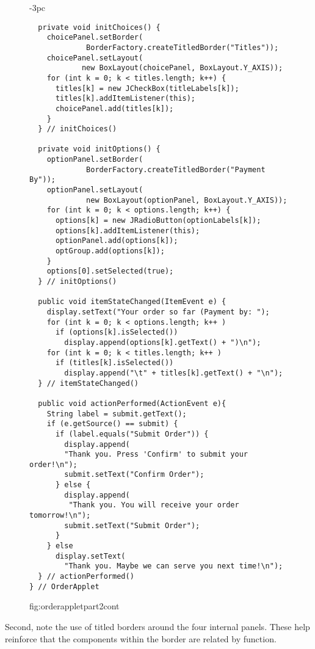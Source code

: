 \begin{figure}[p]
\addtocounter{figure}{-1}
\jjjprogstart
\begin{jjjlistingleft}[29pc]{-3pc}
\begin{lstlisting}
  private void initChoices() {
    choicePanel.setBorder(
             BorderFactory.createTitledBorder("Titles"));
    choicePanel.setLayout(
            new BoxLayout(choicePanel, BoxLayout.Y_AXIS));
    for (int k = 0; k < titles.length; k++) {
      titles[k] = new JCheckBox(titleLabels[k]);
      titles[k].addItemListener(this);
      choicePanel.add(titles[k]);
    }
  } // initChoices()

  private void initOptions() {
    optionPanel.setBorder(
             BorderFactory.createTitledBorder("Payment By"));
    optionPanel.setLayout(
             new BoxLayout(optionPanel, BoxLayout.Y_AXIS));
    for (int k = 0; k < options.length; k++) {
      options[k] = new JRadioButton(optionLabels[k]);
      options[k].addItemListener(this);
      optionPanel.add(options[k]);
      optGroup.add(options[k]);
    }
    options[0].setSelected(true);
  } // initOptions()

  public void itemStateChanged(ItemEvent e) {
    display.setText("Your order so far (Payment by: ");
    for (int k = 0; k < options.length; k++ )
      if (options[k].isSelected())
        display.append(options[k].getText() + ")\n");
    for (int k = 0; k < titles.length; k++ )
      if (titles[k].isSelected())
        display.append("\t" + titles[k].getText() + "\n");
  } // itemStateChanged()

  public void actionPerformed(ActionEvent e){
    String label = submit.getText();
    if (e.getSource() == submit) {
      if (label.equals("Submit Order")) {
        display.append(
        "Thank you. Press 'Confirm' to submit your order!\n");
        submit.setText("Confirm Order");
      } else {
        display.append(
         "Thank you. You will receive your order tomorrow!\n");
        submit.setText("Submit Order");
      }
    } else
      display.setText(
        "Thank you. Maybe we can serve you next time!\n");
  } // actionPerformed()
} // OrderApplet
\end{lstlisting}
\end{jjjlistingleft}
 {fig:orderappletpart2cont}
\end{figure}

Second, note the use of titled borders around the four internal
panels. These help reinforce that the components within the
border are related by function.

